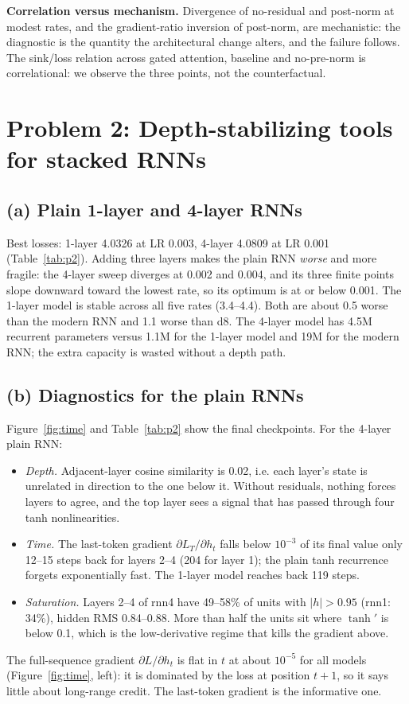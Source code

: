 \documentclass[10pt,letterpaper]{article}
\begin{document}
\textbf{Correlation versus mechanism.} Divergence of no-residual and post-norm at modest rates, and the gradient-ratio inversion of post-norm, are mechanistic: the diagnostic is the quantity the architectural change alters, and the failure follows. The sink/loss relation across gated attention, baseline and no-pre-norm is correlational: we observe the three points, not the counterfactual.

\section*{Problem 2: Depth-stabilizing tools for stacked RNNs}

\subsection*{(a) Plain 1-layer and 4-layer RNNs}

Best losses: 1-layer 4.0326 at LR 0.003, 4-layer 4.0809 at LR 0.001 (Table~\ref{tab:p2}). Adding three layers makes the plain RNN \emph{worse} and more fragile: the 4-layer sweep diverges at 0.002 and 0.004, and its three finite points slope downward toward the lowest rate, so its optimum is at or below 0.001. The 1-layer model is stable across all five rates (3.4--4.4). Both are about 0.5 worse than the modern RNN and 1.1 worse than d8. The 4-layer model has 4.5M recurrent parameters versus 1.1M for the 1-layer model and 19M for the modern RNN; the extra capacity is wasted without a depth path.

\subsection*{(b) Diagnostics for the plain RNNs}

Figure~\ref{fig:time} and Table~\ref{tab:p2} show the final checkpoints. For the 4-layer plain RNN:
\begin{itemize}
\item \emph{Depth.} Adjacent-layer cosine similarity is 0.02, i.e. each layer's state is unrelated in direction to the one below it. Without residuals, nothing forces layers to agree, and the top layer sees a signal that has passed through four tanh nonlinearities.
\item \emph{Time.} The last-token gradient $\partial L_T/\partial h_t$ falls below $10^{-3}$ of its final value only 12--15 steps back for layers 2--4 (204 for layer 1); the plain tanh recurrence forgets exponentially fast. The 1-layer model reaches back 119 steps.
\item \emph{Saturation.} Layers 2--4 of rnn4 have 49--58\% of units with $|h|>0.95$ (rnn1: 34\%), hidden RMS 0.84--0.88. More than half the units sit where $\tanh'$ is below 0.1, which is the low-derivative regime that kills the gradient above.
\end{itemize}
The full-sequence gradient $\partial L/\partial h_t$ is flat in $t$ at about $10^{-5}$ for all models (Figure~\ref{fig:time}, left): it is dominated by the loss at position $t{+}1$, so it says little about long-range credit. The last-token gradient is the informative one.
\end{document}
